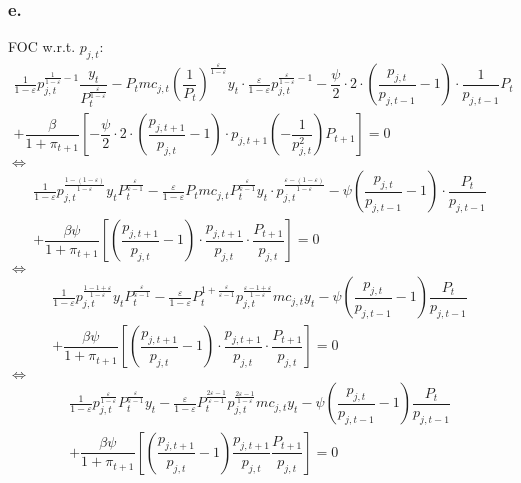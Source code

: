 \documentclass{article}
\begin{document}
\subsubsection*{e.}

FOC w.r.t. $p_{j,t}$:
\begin{multline*}
    \frac{1}{1-\varepsilon}p_{j,t}^{\frac{1}{1-\varepsilon}-1}\dfrac{y_{t}}{P_{t}^{\frac{\varepsilon}{1-\varepsilon}}}-P_{t}mc_{j,t}\left(\dfrac{1}{P_{t}}\right)^{\frac{\varepsilon}{1-\varepsilon}}y_{t}\cdot\frac{\varepsilon}{1-\varepsilon}p_{j,t}^{\frac{\varepsilon}{1-\varepsilon}-1}-\dfrac{\psi}{2}\cdot2\cdot\left(\dfrac{p_{j,t}}{p_{j,t-1}}-1\right)\cdot\dfrac{1}{p_{j,t-1}}P_{t}\\
    +\dfrac{\beta}{1+\pi_{t+1}}\left[-\dfrac{\psi}{2}\cdot2\cdot\left(\dfrac{p_{j,t+1}}{p_{j,t}}-1\right)\cdot p_{j,t+1}\left(-\dfrac{1}{p^{2}_{j,t}}\right)P_{t+1}\right]=0
\end{multline*}
$\iff$
\begin{multline*}
    \frac{1}{1-\varepsilon}p_{j,t}^{\frac{1-\left(1-\varepsilon\right)}{1-\varepsilon}}y_{t}P_{t}^{\frac{\varepsilon}{\varepsilon-1}}-\frac{\varepsilon}{1-\varepsilon}P_{t}mc_{j,t}P_{t}^{\frac{\varepsilon}{\varepsilon-1}}y_{t}\cdot p_{j,t}^{\frac{\varepsilon-\left(1-\varepsilon\right)}{1-\varepsilon}}-\psi\left(\dfrac{p_{j,t}}{p_{j,t-1}}-1\right)\cdot\dfrac{P_{t}}{p_{j,t-1}}\\
    +\dfrac{\beta\psi}{1+\pi_{t+1}}\left[\left(\dfrac{p_{j,t+1}}{p_{j,t}}-1\right)\cdot\dfrac{p_{j,t+1}}{p_{j,t}}\cdot\dfrac{P_{t+1}}{p_{j,t}}\right]=0
\end{multline*}
$\iff$
\begin{multline*}
    \frac{1}{1-\varepsilon}p_{j,t}^{\frac{1-1+\varepsilon}{1-\varepsilon}}y_{t}P_{t}^{\frac{\varepsilon}{\varepsilon-1}}-\frac{\varepsilon}{1-\varepsilon}P_{t}^{1+\frac{\varepsilon}{\varepsilon-1}}p_{j,t}^{\frac{\varepsilon-1+\varepsilon}{1-\varepsilon}}mc_{j,t}y_{t}-\psi\left(\dfrac{p_{j,t}}{p_{j,t-1}}-1\right)\dfrac{P_{t}}{p_{j,t-1}}\\
    +\dfrac{\beta\psi}{1+\pi_{t+1}}\left[\left(\dfrac{p_{j,t+1}}{p_{j,t}}-1\right)\cdot\dfrac{p_{j,t+1}}{p_{j,t}}\cdot\dfrac{P_{t+1}}{p_{j,t}}\right]=0
\end{multline*}
$\iff$
\begin{multline*}
    \frac{1}{1-\varepsilon}p_{j,t}^{\frac{\varepsilon}{1-\varepsilon}}P_{t}^{\frac{\varepsilon}{\varepsilon-1}}y_{t}-\frac{\varepsilon}{1-\varepsilon}P_{t}^{\frac{2\varepsilon-1}{\varepsilon-1}}p_{j,t}^{\frac{2\varepsilon-1}{1-\varepsilon}}mc_{j,t}y_{t}-\psi\left(\dfrac{p_{j,t}}{p_{j,t-1}}-1\right)\dfrac{P_{t}}{p_{j,t-1}}\\
    +\dfrac{\beta\psi}{1+\pi_{t+1}}\left[\left(\dfrac{p_{j,t+1}}{p_{j,t}}-1\right)\dfrac{p_{j,t+1}}{p_{j,t}}\dfrac{P_{t+1}}{p_{j,t}}\right]=0
\end{multline*}
\end{document}
